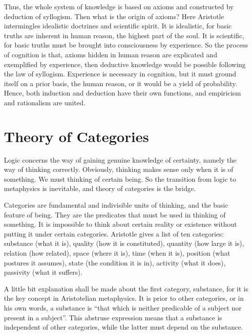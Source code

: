 \documentclass[11pt]{article}
\begin{document}
\newline

Thus, the whole system of knowledge is based on axioms and constructed by deduction of syllogism. 
Then what is the origin of axioms? 
Here Aristotle intermingles idealistic doctrines and scientific spirit. 
It is idealistic, for basic truths are inherent in human reason, the highest part of the soul. 
It is scientific, for basic truths must be brought into consciousness by experience. 
So the process of cognition is that, axioms hidden in human reason are explicated and exemplified by experience, then deductive knowledge would be possible following the law of syllogism. 
Experience is necessary in cognition, but it must ground itself on a prior basis, the human reason, or it would be a yield of probability. 
Hence, both induction and deduction have their own functions, and empiricism and rationalism are united.

\section{Theory of Categories}
Logic concerns the way of gaining genuine knowledge of certainty, namely the way of thinking correctly. 
Obviously, thinking makes sense only when it is of something. 
We must thinking of certain being. 
So the transition from logic to metaphysics is inevitable, and theory of categories is the bridge.

\newline

Categories are fundamental and indivisible units of thinking, and the basic feature of being. 
They are the predicates that must be used in thinking of something. 
It is impossible to think about certain reality or existence without putting it under certain categories. 
Aristotle gives a list of ten categories: 
substance (what it is), 
quality (how it is constituted), 
quantity (how large it is), 
relation (how related), 
space (where it is), 
time (when it is), 
position (what postures it assumes), 
state (the condition it is in), 
activity (what it does), 
passivity (what it suffers).

\newline

A little bit explanation shall be made about the first category, substance, for it is the key concept in Aristotelian metaphysics. 
It is prior to other categories, or in his own words, a substance is “that which is neither predicable of a subject nor present in a subject”. 
This abstruse expression means that a substance is independent of other categories, while the latter must depend on the substance. 
\end{document}
